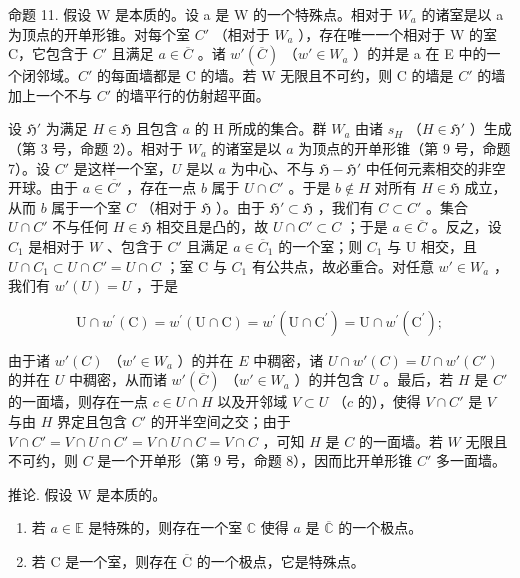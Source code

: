 命题 11. 假设 W 是本质的。设 a 是 W 的一个特殊点。相对于 \(W_{a}\) 的诸室是以 a 为顶点的开单形锥。对每个室 \(C'\) （相对于 \(W_{a}\) ），存在唯一一个相对于 W 的室 C，它包含于 \(C'\) 且满足 \(a \in \overline{C}\) 。诸 \(w'(\overline{C})\) （\(w' \in W_{a}\) ）的并是 a 在 E 中的一个闭邻域。\(C'\) 的每面墙都是 C 的墙。若 W 无限且不可约，则 C 的墙是 \(C'\) 的墙加上一个不与 \(C'\) 的墙平行的仿射超平面。

设 \(\mathfrak{H}'\) 为满足 \(H \in \mathfrak{H}\) 且包含 \(a\) 的 H 所成的集合。群 \(W_a\) 由诸 \(s_H\) （\(H \in \mathfrak{H}'\) ）生成（第 3 号，命题 2）。相对于 \(W_a\) 的诸室是以 \(a\) 为顶点的开单形锥（第 9 号，命题 7）。设 \(C'\) 是这样一个室，\(U\) 是以 \(a\) 为中心、不与 \(\mathfrak{H} - \mathfrak{H}'\) 中任何元素相交的非空开球。由于 \(a \in \overline{C'}\) ，存在一点 \(b\) 属于 \(U \cap C'\) 。于是 \(b \notin H\) 对所有 \(H \in \mathfrak{H}\) 成立，从而 \(b\) 属于一个室 \(C\) （相对于 \(\mathfrak{H}\) ）。由于 \(\mathfrak{H}' \subset \mathfrak{H}\) ，我们有 \(C \subset C'\) 。集合 \(U \cap C'\) 不与任何 \(H \in \mathfrak{H}\) 相交且是凸的，故 \(U \cap C' \subset C\) ；于是 \(a \in \overline{C}\) 。反之，设 \(C_1\) 是相对于 \(W\) 、包含于 \(C'\) 且满足 \(a \in \overline{C}_{1}\) 的一个室；则 \(C_{1}\) 与 U 相交，且 \(U \cap C_{1} \subset U \cap C' = U \cap C\) ；室 C 与 \(C_{1}\) 有公共点，故必重合。对任意 \(w' \in W_{a}\) ，我们有 \(w'(U) = U\) ，于是

\[
\mathrm{U} \cap w ^ {\prime} (\mathrm{C}) = w ^ {\prime} (\mathrm{U} \cap \mathrm{C}) = w ^ {\prime} (\mathrm{U} \cap \mathrm{C} ^ {\prime}) = \mathrm{U} \cap w ^ {\prime} (\mathrm{C} ^ {\prime});
\]

由于诸 \(w'(C)\) （\(w' \in W_a\) ）的并在 \(E\) 中稠密，诸 \(U \cap w'(C) = U \cap w'(C')\) 的并在 \(U\) 中稠密，从而诸 \(w'(\overline{C})\) （\(w' \in W_a\) ）的并包含 \(U\) 。最后，若 \(H\) 是 \(C'\) 的一面墙，则存在一点 \(c \in U \cap H\) 以及开邻域 \(V \subset U\) （\(c\) 的），使得 \(V \cap C'\) 是 \(V\) 与由 \(H\) 界定且包含 \(C'\) 的开半空间之交；由于 \(V \cap C' = V \cap U \cap C' = V \cap U \cap C = V \cap C\) ，可知 \(H\) 是 \(C\) 的一面墙。若 \(W\) 无限且不可约，则 \(C\) 是一个开单形（第 9 号，命题 8），因而比开单形锥 \(C'\) 多一面墙。

推论. 假设 W 是本质的。

\begin{enumerate}
\def\labelenumi{(\roman{enumi})}
\item
  若 \(a \in \mathbb{E}\) 是特殊的，则存在一个室 \(\mathbb{C}\) 使得 \(a\) 是 \(\overline{\mathbb{C}}\) 的一个极点。
\item
  若 \(\mathrm{C}\) 是一个室，则存在 \(\overline{\mathrm{C}}\) 的一个极点，它是特殊点。
\end{enumerate}

